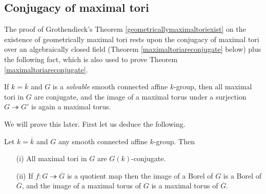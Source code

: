 \documentclass[10pt]{article}
\renewcommand{\(}{\left(}
\renewcommand{\)}{\right)}
\numberwithin{thm}{subsection}
\begin{document}
\subsection{Conjugacy of maximal tori}
The proof of Grothendieck's Theorem \ref{geometricallymaximaltoriexist}
on the existence of geometrically maximal tori
rests upon the conjugacy of maximal tori over an algebraically closed field
(Theorem \ref{maximaltoriareconjugate} below)
plus the following fact, which is also used to prove Theorem \ref{maximaltoriareconjugate}.
\begin{prop}\label{maximaltoriareconjugate(solvable)}
If $k=\overline{k}$ and $G$ is a \textit{solvable} smooth connected affine $k$-group,
then all maximal tori in $G$ are conjugate,
and the image of a maximal torus
under a surjection $G\twoheadrightarrow G'$
is again a maximal torus.
\end{prop}
We will prove this later.
First let us deduce the following.
\begin{thm}\label{maximaltoriareconjugate}
Let $k=\overline{k}$ and $G$ any smooth connected affine $k$-group.
Then
\begin{itemize}
\item[(i)]All maximal tori in $G$ are $G(k)$-conjugate.
\item[(ii)]If $f:G\twoheadrightarrow\overline{G}$
is a quotient map
then the image of a Borel of $G$ is a Borel of $\overline{G}$,
and the image of a maximal torus of $G$
is a maximal torus of $\overline{G}$.
\end{itemize}
\end{thm}
\end{document}
